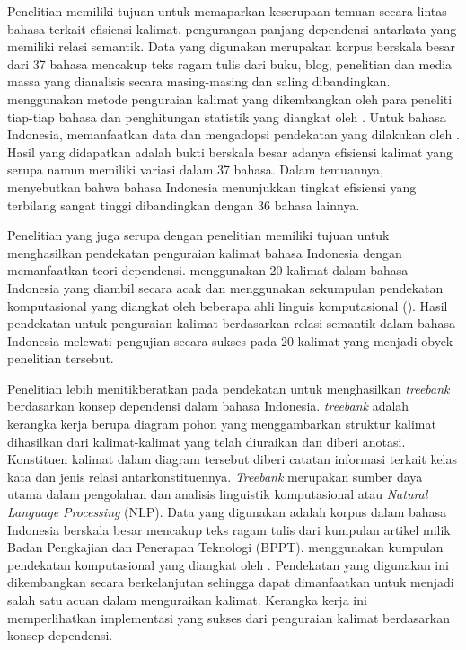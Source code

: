 Penelitian \cite{futrell2015large} memiliki tujuan untuk memaparkan keserupaan temuan secara lintas bahasa terkait efisiensi kalimat. \Gls{pengurangan-panjang-dependensi} antarkata yang memiliki relasi semantik. Data yang digunakan merupakan korpus berskala besar dari 37 bahasa mencakup teks ragam tulis dari buku, blog, penelitian dan media massa yang dianalisis secara masing-masing dan saling dibandingkan. \cite{futrell2015large} menggunakan metode penguraian kalimat yang dikembangkan oleh para peneliti tiap-tiap bahasa dan penghitungan statistik yang diangkat oleh \cite{gelman2007data}. Untuk bahasa Indonesia, \cite{futrell2015large} memanfaatkan data dan mengadopsi pendekatan yang dilakukan oleh \cite{green2012indonesian}. Hasil yang didapatkan adalah bukti berskala besar adanya efisiensi kalimat yang serupa namun memiliki variasi dalam 37 bahasa. Dalam temuannya, \cite{futrell2015large} menyebutkan bahwa bahasa Indonesia menunjukkan tingkat efisiensi yang terbilang sangat tinggi dibandingkan dengan 36 bahasa lainnya. 

Penelitian \cite{green2012indonesian} yang juga serupa dengan penelitian \cite{kamayani2011dependency} memiliki tujuan untuk menghasilkan pendekatan penguraian kalimat bahasa Indonesia dengan memanfaatkan teori dependensi. \cite{kamayani2011dependency} menggunakan 20 kalimat dalam bahasa Indonesia yang diambil secara acak dan menggunakan sekumpulan pendekatan komputasional yang diangkat oleh beberapa ahli linguis komputasional (\citealp{nivre2006dependency, covington2001fundamental, de2008stanford, de2014universal}). Hasil pendekatan untuk penguraian kalimat berdasarkan relasi semantik dalam bahasa Indonesia melewati pengujian secara sukses pada 20 kalimat yang menjadi obyek penelitian tersebut.

Penelitian \cite{green2012indonesian} lebih menitikberatkan pada pendekatan untuk menghasilkan \textit{treebank} berdasarkan konsep dependensi dalam bahasa Indonesia. \textit{treebank} adalah kerangka kerja berupa diagram pohon yang menggambarkan struktur kalimat dihasilkan dari kalimat-kalimat yang telah diuraikan dan diberi anotasi. Konstituen kalimat dalam diagram tersebut diberi catatan informasi terkait kelas kata dan jenis relasi antarkonstituennya. \textit{Treebank} merupakan sumber daya utama dalam pengolahan dan analisis linguistik komputasional atau \textit{Natural Language Processing} (NLP). Data yang digunakan adalah korpus dalam bahasa Indonesia berskala besar mencakup teks ragam tulis dari kumpulan artikel milik Badan Pengkajian dan Penerapan Teknologi (BPPT). \cite{green2012indonesian} menggunakan kumpulan pendekatan komputasional yang diangkat oleh \cite{kubler2009dependency}. Pendekatan yang digunakan \cite{green2012indonesian} ini dikembangkan secara berkelanjutan sehingga dapat dimanfaatkan untuk menjadi salah satu acuan dalam menguraikan kalimat. Kerangka kerja ini memperlihatkan implementasi yang sukses dari penguraian kalimat berdasarkan konsep dependensi.

